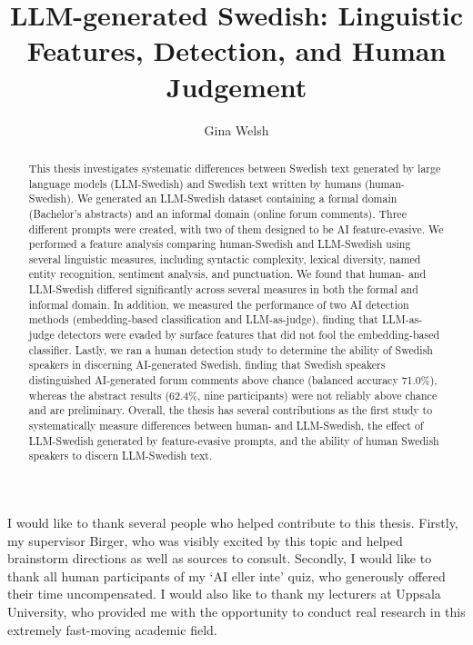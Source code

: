 \documentclass[thesis]{cluu}
\begin{document}
\title{LLM-generated Swedish: Linguistic Features, Detection, and Human Judgement}
\author{Gina Welsh}

\maketitle

\begin{abstract}

This thesis investigates systematic differences between Swedish text generated
by large language models (LLM-Swedish) and Swedish text written by humans (human-Swedish). We generated an LLM-Swedish dataset containing a formal domain (Bachelor's abstracts) and an informal domain (online forum comments). Three different prompts were created, with two of them designed to be AI feature-evasive. We performed a feature analysis comparing human-Swedish and LLM-Swedish using several linguistic measures, including syntactic complexity, lexical diversity, named entity recognition, sentiment analysis, and punctuation. We found that human- and LLM-Swedish differed significantly across several measures in both the formal and informal domain. In addition, we measured the performance of two AI detection methods (embedding-based classification and LLM-as-judge), finding that LLM-as-judge detectors were evaded by surface features that did not fool the embedding-based classifier. Lastly, we ran a human detection study to determine the ability of Swedish speakers in discerning AI-generated Swedish, finding that Swedish speakers distinguished AI-generated forum comments above chance (balanced accuracy 71.0\%), whereas the abstract results (62.4\%, nine participants) were not reliably above chance and are preliminary. Overall, the thesis has several contributions as the first study to systematically measure differences between human- and LLM-Swedish, the effect of LLM-Swedish generated by feature-evasive prompts, and the ability of human Swedish speakers to discern LLM-Swedish text.

\end{abstract}

\tableofcontents

I would like to thank several people who helped contribute to this thesis. Firstly, my supervisor Birger, who was visibly excited by this topic and helped brainstorm directions as well as sources to consult. Secondly, I would like to thank all human participants of my `AI eller inte' quiz, who generously offered their time uncompensated. I would also like to thank my lecturers at Uppsala University, who provided me with the opportunity to conduct real research in this extremely fast-moving academic field. 
\end{document}
